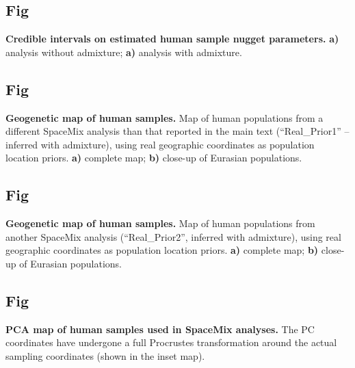 \documentclass[10pt,letterpaper]{article}
\begin{document}
\subsection{Fig}
\label{sfig:globe_nuggs}
{\bf{
Credible intervals on estimated human sample nugget parameters.}}
\textbf{a)} analysis without admixture; 
\textbf{a)} analysis with admixture.

\subsection{Fig}
\label{sfig:globe_ad_maps_realpr2}
{\bf{
Geogenetic map of human samples.}}
Map of human populations from a different SpaceMix analysis 
than that reported in the main text
(``Real\_Prior1'' -- inferred with admixture), 
using real geographic coordinates as population location priors.
\textbf{a)} complete map; 
\textbf{b)} close-up of Eurasian populations.

\subsection{Fig}
\label{sfig:globe_ad_maps_realpr3}
{\bf{
Geogenetic map of human samples.}}
Map of human populations from another SpaceMix analysis 
(``Real\_Prior2'',  inferred with admixture), 
using real geographic coordinates as population location priors.
\textbf{a)} complete map; 
\textbf{b)} close-up of Eurasian populations.


\subsection{Fig}
\label{sfig:globe_PCA_map}
{\bf{
PCA map of human samples used in SpaceMix analyses.}} 
The PC coordinates have undergone a full Procrustes transformation 
around the actual sampling coordinates (shown in the inset map).
\end{document}
